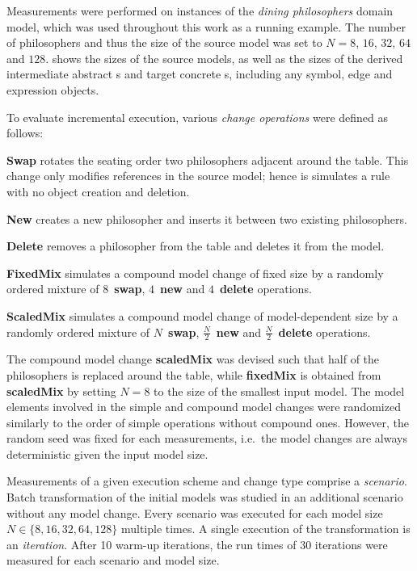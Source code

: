 Measurements were performed on instances of the \emph{dining philosophers} domain model, which was used throughout this work as a running example. The number of philosophers and thus the size of the source model was set to \(N = 8\), \(16\), \(32\), \(64\) and \(128\).  shows the sizes of the source models, as well as the sizes of the derived intermediate abstract s and target concrete s, including any symbol, edge and expression objects.

To evaluate incremental execution, various \emph{change operations} were defined as follows:
\begin{itemize*}
\item \textbf{Swap} rotates the seating order two philosophers adjacent around the table. This change only modifies references in the source model; hence is simulates a  rule with no object creation and deletion.
\item \textbf{New} creates a new philosopher and inserts it between two existing philosophers.
\item \textbf{Delete} removes a philosopher from the table and deletes it from the model.
\item \textbf{Fixed\-Mix} simulates a compound model change of fixed size by a randomly ordered mixture of \(8\)~\textbf{swap}, \(4\)~\textbf{new} and \(4\)~\textbf{delete} operations.
\item \textbf{Scaled\-Mix} simulates a compound model change of model-dependent size by a randomly ordered mixture of \(N\)~\textbf{swap}, \(\frac{N}{2}\)~\textbf{new} and \(\frac{N}{2}\)~\textbf{delete} operations.
\end{itemize*}

The compound model change \textbf{scaled\-Mix} was devised such that half of the philosophers is replaced around the table, while \textbf{fixed\-Mix} is obtained from \textbf{scaled\-Mix} by setting \(N = 8\) to the size of the smallest input model. The model elements involved in the simple and compound model changes were randomized similarly to the order of simple operations without compound ones. However, the random seed was fixed for each measurements, i.e.~the model changes are always deterministic given the input model size.

Measurements of a given execution scheme and change type comprise a \emph{scenario}. Batch transformation of the initial models was studied in an additional scenario without any model change. Every scenario was executed for each model size \(N \in \{8, 16, 32, 64, 128\}\) multiple times. A single execution of the transformation is an \emph{iteration}. After 10 warm-up iterations, the run times of 30 iterations were measured for each scenario and model size.

